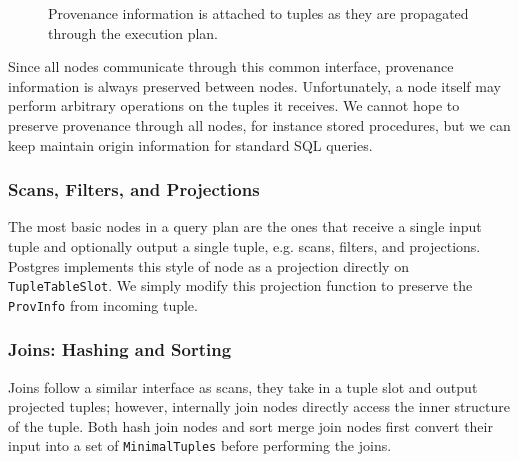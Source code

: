 \begin{figure}
  \centering
    
    
    \caption {Provenance information is attached to tuples as they are propagated through the execution plan. }
\end{figure}

Since all nodes communicate through this common interface, provenance information is always preserved between nodes. Unfortunately, a node itself may perform arbitrary operations on the tuples it receives. We cannot hope to preserve provenance through all nodes, for instance stored procedures, but we can keep maintain origin information for standard SQL queries.   
 
\subsubsection{Scans, Filters, and Projections}

The most basic nodes in a query plan are the ones that receive a single input tuple and optionally output a single tuple, e.g. scans, filters, and projections. Postgres implements this style of node as a projection directly on \texttt{TupleTableSlot}. We simply modify this projection function to preserve the \texttt{ProvInfo} from incoming tuple.

\subsubsection{Joins: Hashing and Sorting}

Joins follow a similar interface as scans, they take in a tuple slot and output projected tuples; however, internally join nodes directly access the inner structure of the tuple. Both hash join nodes and sort merge join nodes first convert their input into a set of \texttt{MinimalTuples} before performing the joins. 

